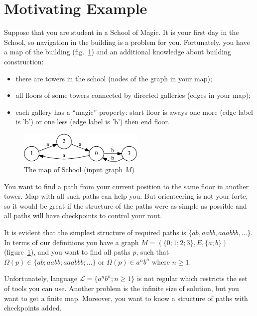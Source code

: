 \section{Motivating Example}\label{motivExample}

Suppose that you are student in a School of Magic.
It is your first day in the School, so navigation in the building is a problem for you.
Fortunately, you have a map of the building (fig.~\ref{input}) and an additional knowledge about building construction:
\begin{itemize}
  \item there are towers in the school (nodes of the graph in your map);
  \item all floors of some towers connected by directed galleries (edges in your map);
  \item each gallery has a ``magic'' property: start floor is aways one more (edge label is 'b') or one less (edge label is 'b') then end floor. 
\end{itemize}

\begin{figure}[h]
    \begin{center}
        \includegraphics[width=6cm]{dot/input.pdf}
        \caption{The map of School (input graph $M$)}
        \label{input}        
    \end{center}
\end{figure}


You want to find a path from your current position to the same floor in another tower. 
Map with all such paths can help you.
But orienteering is not your forte, so it would be great if the structure of the paths were as simple as possible and all paths will have checkpoints to control your rout.

It is evident that the simplest structure of required paths is $\{ab, aabb, aaabbb, \dots\}$.
In terms of our definitions you have a graph $M=(\{0;1;2;3\},E,\{a;b\})$ (figure~\ref{input}), and you want to find all paths $p$, such that $\Omega(p) \in \{ab; aabb; aaabbb; \dots\}$ or $\Omega(p) \in a^n b^n$ where $n \geq 1$.


Unfortunately, language $\mathcal{L} = \{a^n b^n; n \geq 1\}$ is not regular which restricts the set of tools you can use. 
Another problem is the infinite size of solution, but you want to get a finite map.  
Moreover, you want to know a structure of paths with checkpoints added.

